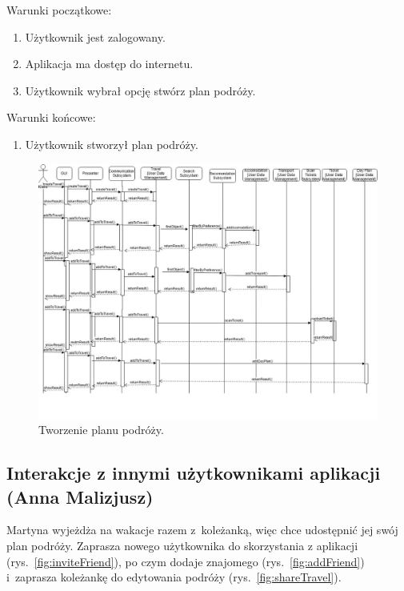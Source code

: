 \documentclass[10pt,twoside,a4paper]{report}
\begin{document}
\noindent\newline Warunki początkowe:
\begin{enumerate}
  \item Użytkownik jest zalogowany.
  \item Aplikacja ma dostęp do internetu.
  \item Użytkownik wybrał opcję stwórz plan podróży.
\end{enumerate}
\par
\noindent\newline
Warunki końcowe:
\begin{enumerate}
  \item Użytkownik stworzył plan podróży.
\end{enumerate}

\noindent\newline
\begin{figure}[h]
\centering
\includegraphics[width=\linewidth]{addTravel}
\caption{Tworzenie planu podróży.}
\label{fig:addTravel}
\end{figure}

\FloatBarrier
\subsection{Interakcje z innymi użytkownikami aplikacji (Anna Malizjusz)}
\par Martyna wyjeżdża na wakacje razem z~koleżanką, więc chce udostępnić jej swój plan podróży. Zaprasza nowego użytkownika do skorzystania z aplikacji (rys.~\ref{fig:inviteFriend}), po czym dodaje znajomego (rys.~\ref{fig:addFriend}) i~zaprasza koleżankę do edytowania podróży (rys.~\ref{fig:shareTravel}).
\FloatBarrier
\end{document}
